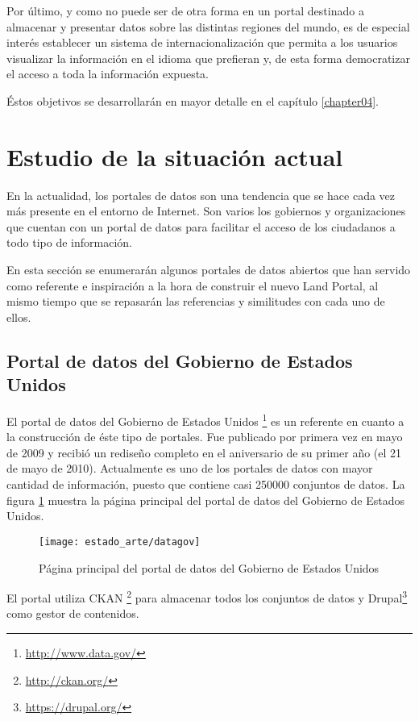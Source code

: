 {Por último, y como no puede ser de otra forma en un portal destinado a almacenar y presentar datos sobre las distintas regiones del mundo, es de especial interés establecer un sistema de internacionalización que permita a los usuarios visualizar la información en el idioma que prefieran y, de esta forma democratizar el acceso a toda la información expuesta.

Éstos objetivos se desarrollarán en mayor detalle en el capítulo \ref{chapter04}.



\section{Estudio de la situación actual}
\label{estudio_situacion_actual}
En la actualidad, los portales de datos son una tendencia que se hace cada vez más presente en el entorno de Internet.  Son varios los gobiernos y organizaciones que cuentan con un portal de datos para facilitar el acceso de los ciudadanos a todo tipo de información.

En esta sección se enumerarán algunos portales de datos abiertos que han servido como referente e inspiración a la hora de construir el nuevo Land Portal, al mismo tiempo que se repasarán las referencias y similitudes con cada uno de ellos.

\subsection{Portal de datos del Gobierno de Estados Unidos}
El portal de datos del Gobierno de Estados Unidos \footnote{\url{http://www.data.gov/}} es un referente en cuanto a la construcción de éste tipo de portales.  Fue publicado por primera vez en mayo de 2009 y recibió un rediseño completo en el aniversario de su primer año (el 21 de mayo de 2010).  Actualmente es uno de los portales de datos con mayor cantidad de información, puesto que contiene casi 250000 conjuntos de datos.  La figura \ref{fig:estado_arte_datagov} muestra la página principal del portal de datos del Gobierno de Estados Unidos.
\begin{figure}[h]
\centering
\texttt{[image: estado\_arte/datagov]}
\caption{Página principal del portal de datos del Gobierno de Estados Unidos}
\label{fig:estado_arte_datagov}
\end{figure}

El portal utiliza CKAN \footnote{\url{http://ckan.org/}} para almacenar todos los conjuntos de datos y Drupal\footnote{\url{https://drupal.org/}} como gestor de contenidos.

}
